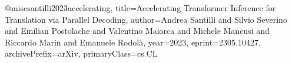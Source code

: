 @misc{santilli2023accelerating,
      title={Accelerating Transformer Inference for Translation via Parallel Decoding},
      author={Andrea Santilli and Silvio Severino and Emilian Postolache and Valentino Maiorca and Michele Mancusi and Riccardo Marin and Emanuele Rodolà},
      year={2023},
      eprint={2305.10427},
      archivePrefix={arXiv},
      primaryClass={cs.CL}
}